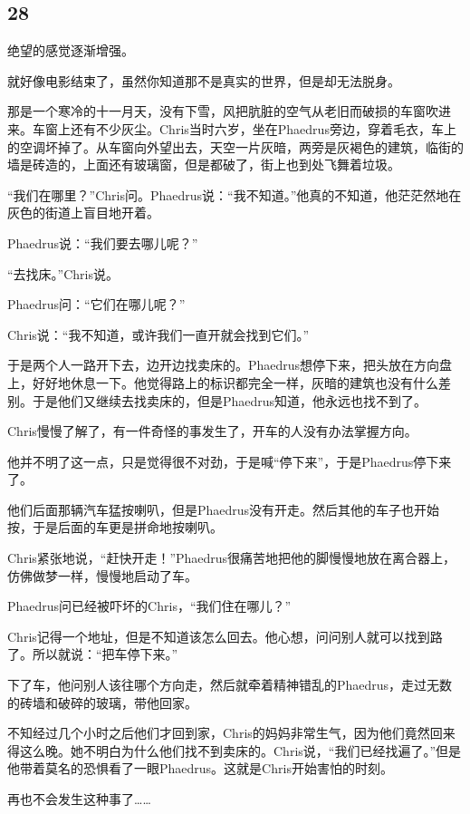 \documentclass[UTF8]{article}
\begin{document}
\subsection*{28}
\par 绝望的感觉逐渐增强。
\par 就好像电影结束了，虽然你知道那不是真实的世界，但是却无法脱身。
\par 那是一个寒冷的十一月天，没有下雪，风把肮脏的空气从老旧而破损的车窗吹进来。车窗上还有不少灰尘。Chris当时六岁，坐在Phaedrus旁边，穿着毛衣，车上的空调坏掉了。从车窗向外望出去，天空一片灰暗，两旁是灰褐色的建筑，临街的墙是砖造的，上面还有玻璃窗，但是都破了，街上也到处飞舞着垃圾。
\par “我们在哪里？”Chris问。Phaedrus说：“我不知道。”他真的不知道，他茫茫然地在灰色的街道上盲目地开着。
\par Phaedrus说：“我们要去哪儿呢？”
\par “去找床。”Chris说。
\par Phaedrus问：“它们在哪儿呢？”
\par Chris说：“我不知道，或许我们一直开就会找到它们。”
\par 于是两个人一路开下去，边开边找卖床的。Phaedrus想停下来，把头放在方向盘上，好好地休息一下。他觉得路上的标识都完全一样，灰暗的建筑也没有什么差别。于是他们又继续去找卖床的，但是Phaedrus知道，他永远也找不到了。
\par Chris慢慢了解了，有一件奇怪的事发生了，开车的人没有办法掌握方向。
\par 他并不明了这一点，只是觉得很不对劲，于是喊“停下来”，于是Phaedrus停下来了。
\par 他们后面那辆汽车猛按喇叭，但是Phaedrus没有开走。然后其他的车子也开始按，于是后面的车更是拼命地按喇叭。
\par Chris紧张地说，“赶快开走！”Phaedrus很痛苦地把他的脚慢慢地放在离合器上，仿佛做梦一样，慢慢地启动了车。
\par Phaedrus问已经被吓坏的Chris，“我们住在哪儿？”
\par Chris记得一个地址，但是不知道该怎么回去。他心想，问问别人就可以找到路了。所以就说：“把车停下来。”
\par 下了车，他问别人该往哪个方向走，然后就牵着精神错乱的Phaedrus，走过无数的砖墙和破碎的玻璃，带他回家。
\par 不知经过几个小时之后他们才回到家，Chris的妈妈非常生气，因为他们竟然回来得这么晚。她不明白为什么他们找不到卖床的。Chris说，“我们已经找遍了。”但是他带着莫名的恐惧看了一眼Phaedrus。这就是Chris开始害怕的时刻。
\par 再也不会发生这种事了……
\end{document}
